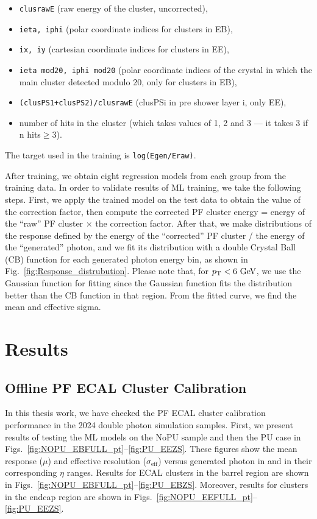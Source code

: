 \begin{itemize}
\item {\tt clusrawE} (raw energy of the cluster, uncorrected),
\item {\tt ieta, iphi} (polar coordinate indices for clusters in EB),
\item {\tt ix, iy} (cartesian coordinate indices for clusters in EE),
\item {\tt ieta mod20, iphi mod20} (polar coordinate indices of the crystal in which the main cluster detected modulo 20, only for clusters in EB),
\item {\tt (clusPS1+clusPS2)/clusrawE} (clusPSi in pre shower layer i, only EE),
\item number of hits in the cluster (which takes values of 1, 2 and 3 --- it takes 3 if n hits$\geq3$).
\end{itemize}
The target used in the training is {\tt log(Egen/Eraw)}.


\noindent
After training, we obtain eight regression models from each group from the training data.
In order to validate results of ML training, we take the following steps.
First, we apply the trained model on the test data to obtain the value of the correction factor,
then compute the corrected PF cluster energy = energy of the ``raw'' PF cluster $\times$ the correction factor.
After that, we make distributions of the response defined by the energy of the ``corrected'' PF cluster / the energy of the ``generated'' photon, and we fit its distribution with
a double Crystal Ball (CB) function for each generated photon energy bin, as shown in Fig.~\ref{fig:Response_distrubution}.
Please note that, for $p_{\mathrm{T}}<6\ \text{Ge\hspace{-.08em}V}$, we use the Gaussian function for fitting since the Gaussian function fits the distribution better than the CB function in that \pt region.
From the fitted curve, we find the mean and effective sigma.


\section{Results}

\subsection{Offline PF ECAL Cluster Calibration}

In this thesis work, we have checked the PF ECAL cluster calibration performance in the 2024 double photon simulation samples.
First, we present results of testing the ML models on the NoPU sample and then the PU case in Figs.~\ref{fig:NOPU_EBFULL_pt}--\ref{fig:PU_EEZS}.
These figures show the mean response ($\mu$) and effective resolution ($\sigma_\mathrm{eff}$) versus generated photon \pt in \GeVns and in their corresponding $\eta$ ranges.
Results for ECAL clusters in the barrel region are shown in Figs.~\ref{fig:NOPU_EBFULL_pt}--\ref{fig:PU_EBZS}.
Moreover, results for clusters in the endcap region are shown in Figs.~\ref{fig:NOPU_EEFULL_pt}--\ref{fig:PU_EEZS}.

